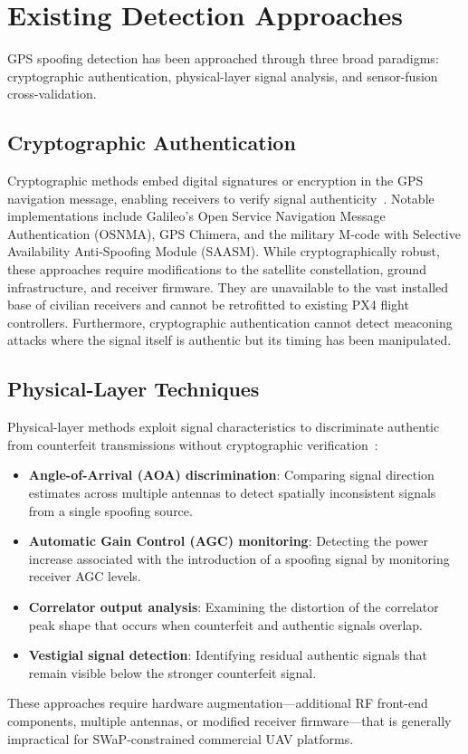 \section{Existing Detection Approaches}

GPS spoofing detection has been approached through three broad paradigms: cryptographic authentication, physical-layer signal analysis, and sensor-fusion cross-validation.

\subsection{Cryptographic Authentication}

Cryptographic methods embed digital signatures or encryption in the GPS navigation message, enabling receivers to verify signal authenticity~\cite{Morales-Ferre2020}. Notable implementations include Galileo's Open Service Navigation Message Authentication (OSNMA), GPS Chimera, and the military M-code with Selective Availability Anti-Spoofing Module (SAASM). While cryptographically robust, these approaches require modifications to the satellite constellation, ground infrastructure, and receiver firmware. They are unavailable to the vast installed base of civilian receivers and cannot be retrofitted to existing PX4 flight controllers. Furthermore, cryptographic authentication cannot detect meaconing attacks where the signal itself is authentic but its timing has been manipulated.

\subsection{Physical-Layer Techniques}

Physical-layer methods exploit signal characteristics to discriminate authentic from counterfeit transmissions without cryptographic verification~\cite{Kumar2022}:
\begin{itemize}
    \item \textbf{Angle-of-Arrival (AOA) discrimination}: Comparing signal direction estimates across multiple antennas to detect spatially inconsistent signals from a single spoofing source.
    \item \textbf{Automatic Gain Control (AGC) monitoring}: Detecting the power increase associated with the introduction of a spoofing signal by monitoring receiver AGC levels.
    \item \textbf{Correlator output analysis}: Examining the distortion of the correlator peak shape that occurs when counterfeit and authentic signals overlap.
    \item \textbf{Vestigial signal detection}: Identifying residual authentic signals that remain visible below the stronger counterfeit signal.
\end{itemize}
These approaches require hardware augmentation---additional RF front-end components, multiple antennas, or modified receiver firmware---that is generally impractical for SWaP-constrained commercial UAV platforms.

